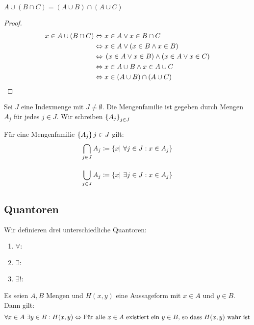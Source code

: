 \begin{lemma}[Distributivität]
    $A\cup (B \cap C) = (A\cup B) \cap (A\cup C)$
    \begin{proof}
        \begin{align*}
            x\in A \cup \left(B \cap C\right) &\Leftrightarrow{} x\in A \lor x\in B \cap C\\
            &\Leftrightarrow{} x\in A \lor \left(x\in B \land x \in B\right)\\
            &\Leftrightarrow{} \left(x\in A \lor x\in B\right)\land\left(x\in A \lor x\in C\right)\\
            &\Leftrightarrow{} x\in A \cup B\land x \in A \cup C\\
            &\Leftrightarrow{} x\in \left(A \cup B\right)\cap\left(A\cup C\right)\qedhere
        \end{align*}
    \end{proof}
\end{lemma}

\begin{definition}
    Sei $J$ eine Indexmenge mit $J\neq \emptyset$. Die Mengenfamilie ist gegeben durch Mengen $A_{j}$ für jedes $j\in J$. Wir schreiben $\left\{A_j\right\}_{j\in J}$
\end{definition}

\begin{definition}
    Für eine Mengenfamilie $\left\{A_j\right\}j\in J$ gilt:
    \begin{align*}
        \bigcap_{j\in J} A_j &\coloneqq \left\{x|~\forall j\in J: x\in A_j\right\}\\[10pt]
        \bigcup_{j\in J} A_j &\coloneqq \left\{x|~\exists j\in J: x\in A_j\right\}
    \end{align*}
\end{definition}

\newpage

\subsection{Quantoren}

\begin{definition}[Quantoren]
    Wir definieren drei unterschiedliche Quantoren:
    \theoremescape
    \begin{enumerate}[label=(\roman*)]
        \item $\forall$: 
        \item $\exists$: 
        \item $\exists!$: 
    \end{enumerate}
    \vspace{0.2cm}
    Es seien $A,B$ Mengen und $H(x,y)$ eine Aussageform mit $x\in A$ und $y \in B$. Dann gilt:
    \begin{align*}
        \forall x \in A~\exists y \in B: H(x,y) \Leftrightarrow{} \text{Für alle $x\in A$ existiert ein $y \in B$, so dass $H(x,y)$ wahr ist}
    \end{align*}
\end{definition}

